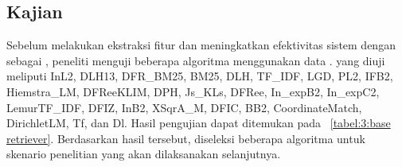 \subsection{Kajian \Base{} \Retriever{}}
\label{subbab:3:Kajian Base Retrieval}
Sebelum melakukan ekstraksi fitur dan meningkatkan efektivitas sistem dengan \lambdamart{} sebagai \reranker{}, peneliti menguji beberapa algoritma \base{} \retriever{} menggunakan data \training{}. \Base{} \retriever{} yang diuji meliputi InL2, DLH13, DFR\_BM25, BM25, DLH, TF\_IDF, LGD, PL2, IFB2, Hiemstra\_LM, DFReeKLIM, DPH, Js\_KLs, DFRee, In\_expB2, In\_expC2, LemurTF\_IDF, DFIZ, InB2, XSqrA\_M, DFIC, BB2, CoordinateMatch, DirichletLM, Tf, dan Dl. Hasil pengujian dapat ditemukan pada \tabel{}~\ref{tabel:3:base retriever}. Berdasarkan hasil tersebut, diseleksi beberapa algoritma untuk skenario penelitian yang akan dilaksanakan selanjutnya.
